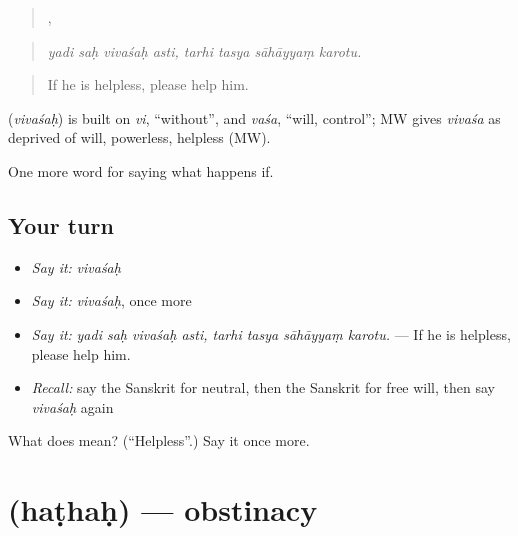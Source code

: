 \begin{quote}
   ,    
\end{quote}

\begin{quote}
\emph{yadi saḥ vivaśaḥ asti, tarhi tasya sāhāyyaṃ karotu.}
\end{quote}

\begin{quote}
If he is helpless, please help him.
\end{quote}

\begin{cousinweb}
\textbf{} (\emph{vivaśaḥ}) is built on \emph{vi}, \textquotedblleft{}without\textquotedblright{}, and \emph{vaśa}, \textquotedblleft{}will, control\textquotedblright{}; MW gives \emph{vivaśa} as deprived of will, powerless, helpless (MW).
\end{cousinweb}

\begin{grammarlens}[title={What you've built}]
One more word for saying what happens if.
\end{grammarlens}

\subsection*{Your turn}
\begin{itemize}
\raggedright
  \item \emph{Say it:} \emph{vivaśaḥ}
  \item \emph{Say it:} \emph{vivaśaḥ}, once more
  \item \emph{Say it:} \emph{yadi saḥ vivaśaḥ asti, tarhi tasya sāhāyyaṃ karotu.} — If he is helpless, please help him.
  \item \emph{Recall:} say the Sanskrit for neutral, then the Sanskrit for free will, then say \emph{vivaśaḥ} again
\end{itemize}

\begin{tcolorbox}[breakable,colback=teal!4,colframe=teal!35!black,title={Before you move on}]
What does  mean? (\textquotedblleft{}Helpless\textquotedblright{}.) Say it once more.
\end{tcolorbox}
\section[\texorpdfstring{\sk{हठः} (haṭhaḥ)}{हठः (haṭhaḥ)}]{ (haṭhaḥ) — obstinacy}

